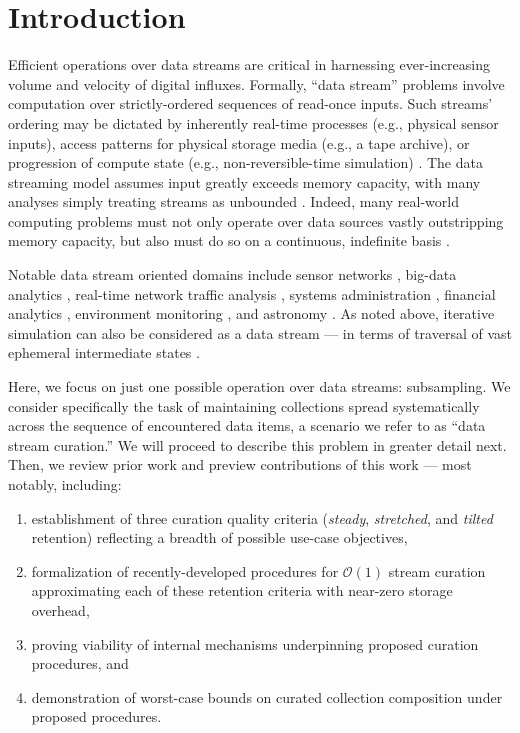 \section{Introduction} \label{sec:introduction}

Efficient operations over data streams are critical in harnessing ever-increasing volume and velocity of digital influxes.
Formally, ``data stream'' problems involve computation over strictly-ordered sequences of read-once inputs.
Such streams' ordering may be dictated by inherently real-time processes (e.g., physical sensor inputs), access patterns for physical storage media (e.g., a tape archive), or progression of compute state (e.g., non-reversible-time simulation) \citep{henzinger1998computing}.
The data streaming model assumes input greatly exceeds memory capacity, with many analyses simply treating streams as unbounded \citep{jiang2006research}.
Indeed, many real-world computing problems must not only operate over data sources vastly outstripping memory capacity, but also must do so on a continuous, indefinite basis \citep{cordeiro2016online}.

Notable data stream oriented domains include sensor networks \citep{elnahrawy2003research}, big-data analytics \citep{he2010comet}, real-time network traffic analysis \citep{johnson2005streams,muthukrishnan2005data}, systems administration \citep{fischer2012real}, financial analytics \citep{rajeshwari2016real,agarwal2009faster}, environment monitoring \citep{hill2009real}, and astronomy \citep{graham2012data}.
As noted above, iterative simulation can also be considered as a data stream --- in terms of traversal of vast ephemeral intermediate states \citep{abdulla2004simulation,schutzel2014stream}.

Here, we focus on just one possible operation over data streams: subsampling.
We consider specifically the task of maintaining collections spread systematically across the sequence of encountered data items, a scenario we refer to as ``data stream curation.''
We will proceed to describe this problem in greater detail next.
Then, we review prior work and preview contributions of this work --- most notably, including:
\begin{enumerate}
\item establishment of three curation quality criteria (\textit{steady}, \textit{stretched}, and \textit{tilted} retention) reflecting a breadth of possible use-case objectives,
\item formalization of recently-developed procedures for $\mathcal{O}(1)$ stream curation approximating each of these retention criteria with near-zero storage overhead,
\item proving viability of internal mechanisms underpinning proposed curation procedures, and
\item demonstration of worst-case bounds on curated collection composition under proposed procedures.
\end{enumerate}





